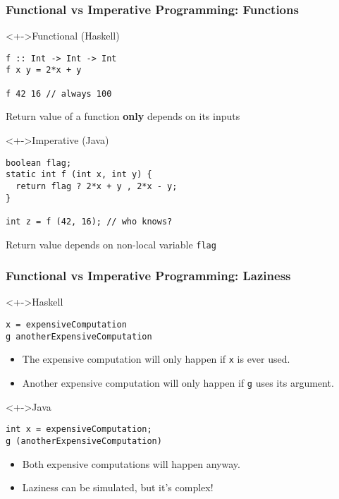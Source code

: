 \documentclass{beamer}
\begin{document}
\begin{frame}[fragile]
  \frametitle{Functional vs Imperative Programming: Functions}
  \begin{block}<+->{Functional (Haskell)}
\begin{verbatim}
f :: Int -> Int -> Int
f x y = 2*x + y

f 42 16 // always 100
\end{verbatim}
    Return value of a function \textbf{only} depends on its inputs
  \end{block}
  \begin{block}<+->{Imperative (Java)}
\begin{verbatim}
boolean flag;
static int f (int x, int y) {
  return flag ? 2*x + y , 2*x - y;
}

int z = f (42, 16); // who knows?
\end{verbatim}
    Return value  depends on non-local variable \texttt{flag}
  \end{block}
\end{frame}

\begin{frame}[fragile]
  \frametitle{Functional vs Imperative Programming: Laziness}
  \begin{block}<+->{Haskell}
\begin{verbatim}
x = expensiveComputation
g anotherExpensiveComputation
\end{verbatim}
    \begin{itemize}
    \item The expensive computation will only happen if \texttt{x} is
      ever used.
    \item Another expensive computation will only happen if \texttt{g}
      uses its argument.
    \end{itemize}
  \end{block}
  \begin{block}<+->{Java}
\begin{verbatim}
int x = expensiveComputation;
g (anotherExpensiveComputation)
\end{verbatim}
    \begin{itemize}
    \item Both expensive computations will happen anyway.
    \item Laziness can be simulated, but it's complex!
  \end{itemize}
  \end{block}
\end{frame}
\end{document}

